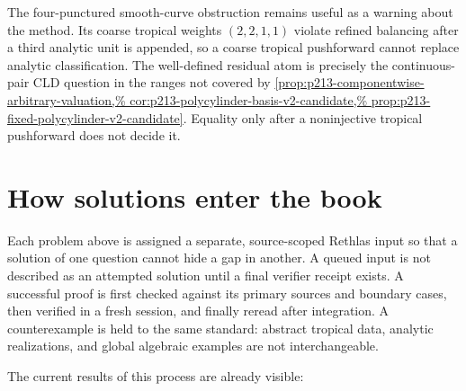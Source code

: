 The four-punctured smooth-curve obstruction remains useful as a warning about
the method.  Its coarse tropical weights \((2,2,1,1)\) violate refined
balancing after a third analytic unit is appended, so a coarse tropical
pushforward cannot replace analytic classification.  The well-defined
residual atom is precisely the continuous-pair CLD question in the ranges
not covered by
\cref{prop:p213-componentwise-arbitrary-valuation,%
cor:p213-polycylinder-basis-v2-candidate,%
prop:p213-fixed-polycylinder-v2-candidate}.  Equality only after a
noninjective tropical pushforward does not decide it.

\section{How solutions enter the book}

Each problem above is assigned a separate, source-scoped Rethlas input so
that a solution of one question cannot hide a gap in another.  A queued input
is not described as an attempted solution until a final verifier receipt
exists.  A successful proof is first checked
against its primary sources and boundary cases, then verified in a fresh
session, and finally reread after integration.  A counterexample is held to
the same standard: abstract tropical data, analytic realizations, and global
algebraic examples are not interchangeable.

The current results of this process are already visible:

